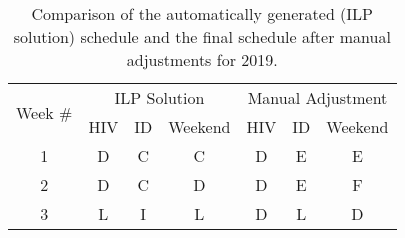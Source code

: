 \begin{table}[htbp]
  \centering
  \caption{Comparison of the automatically generated (ILP solution) schedule and the final schedule after manual adjustments for 2019.}%
  \label{tbl:2019-schedule-comparison}%
	\begin{adjustbox}{scale=0.8}
	\begin{tabular}{c||ccc||ccc}
		\multicolumn{1}{c||}{\multirow{2}[1]{*}{Week \#}} &                                                                                      \multicolumn{3}{c||}{ILP Solution}                                                                                      &                                                                                    \multicolumn{3}{c}{Manual Adjustment}                                                                                     \\
		                                                  &                                HIV                                 &                                 ID                                 &                              Weekend                               &                                HIV                                 &                                 ID                                 &                              Weekend                               \\ \midrule\midrule
		                        1                         &               \cellcolor[rgb]{ .788,  .788,  .788}D                &                  \cellcolor[rgb]{ 1,  .851,  .4}C                  &                  \cellcolor[rgb]{ 1,  .851,  .4}C                  &               \cellcolor[rgb]{ .788,  .788,  .788}D                &                \cellcolor[rgb]{ .957,  .69,  .518}E                &                \cellcolor[rgb]{ .957,  .69,  .518}E                \\
		                        2                         &               \cellcolor[rgb]{ .788,  .788,  .788}D                &                  \cellcolor[rgb]{ 1,  .851,  .4}C                  &               \cellcolor[rgb]{ .788,  .788,  .788}D                &               \cellcolor[rgb]{ .788,  .788,  .788}D                &                \cellcolor[rgb]{ .957,  .69,  .518}E                &               \cellcolor[rgb]{ .557,  .663,  .859}F                \\
		                        3                         &                   \cellcolor[rgb]{ .8,  .2,  0}L                   & \cellcolor[rgb]{ .251,  .251,  .251}\textcolor[rgb]{ 1,  1,  1}{I} &                   \cellcolor[rgb]{ .8,  .2,  0}L                   &               \cellcolor[rgb]{ .788,  .788,  .788}D                &                   \cellcolor[rgb]{ .8,  .2,  0}L                   &               \cellcolor[rgb]{ .788,  .788,  .788}D                \\

\end{tabular}
\end{adjustbox}
\end{table}
